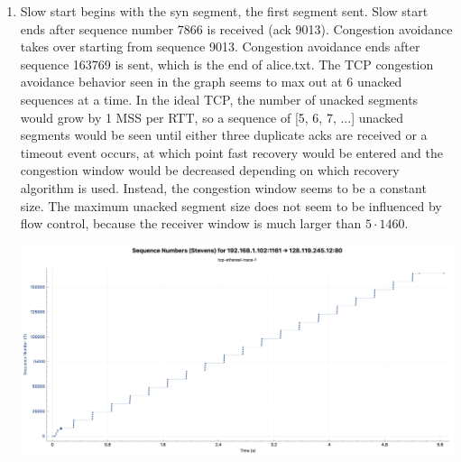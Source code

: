 \documentclass[letter,10pt]{article}
\begin{document}
\begin{enumerate}
	\item Slow start begins with the syn segment, the first segment sent. Slow start ends after sequence number 7866 is received (ack 9013). Congestion avoidance takes over starting from sequence 9013. Congestion avoidance ends after sequence 163769 is sent, which is the end of alice.txt. The TCP congestion avoidance behavior seen in the graph seems to max out at 6 unacked sequences at a time. In the ideal TCP, the number of unacked segments would grow by 1 MSS per RTT, so a sequence of [5, 6, 7, ...] unacked segments would be seen until either three duplicate acks are received or a timeout event occurs, at which point fast recovery would be entered and the congestion window would be decreased depending on which recovery algorithm is used. Instead, the congestion window seems to be a constant size. The maximum unacked segment size does not seem to be influenced by flow control, because the receiver window is much larger than $5 \cdot 1460$.
		\begin{center}
		\noindent\includegraphics[height=.5\textheight,width=.9\textwidth]{./figures/hw9p13}
		\end{center}
	\pagebreak
	

\end{enumerate}
\end{document}
